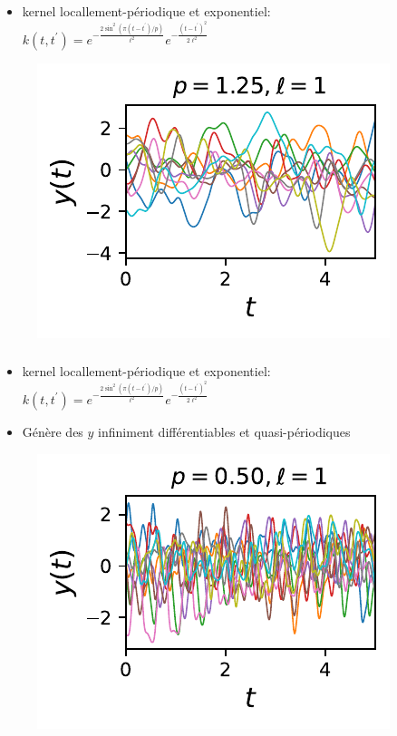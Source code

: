 \documentclass[xcolor=svgnames, t]{beamer}
\begin{document}
\begin{frame}
  \frametitle{\secname}
  
  \begin{itemize}
    \item kernel locallement-périodique et exponentiel:
    $k (t, t^\prime) = e^{- \frac{2 \sin^2(\pi (t - t^\prime) / p)}{\ell^2}} e^{- \frac{(t - t^\prime)^2}{2 \ell^2}} $
  \end{itemize}
  \begin{figure}
    \includegraphics{10_gp_time_LocallyPeriodicKernel_1.25.pdf}
  \end{figure}
\end{frame}

\begin{frame}
  \frametitle{\secname}
  
  \begin{itemize}
    \item kernel locallement-périodique et exponentiel:
    $k (t, t^\prime) = e^{- \frac{2 \sin^2(\pi (t - t^\prime) / p)}{\ell^2}} e^{- \frac{(t - t^\prime)^2}{2 \ell^2}} $
    \item Génère des $y$ infiniment différentiables et quasi-périodiques
  \end{itemize}
  \begin{figure}
    \includegraphics{10_gp_time_LocallyPeriodicKernel_0.50.pdf}
  \end{figure}
\end{frame}


\section[short]{}
\end{document}
